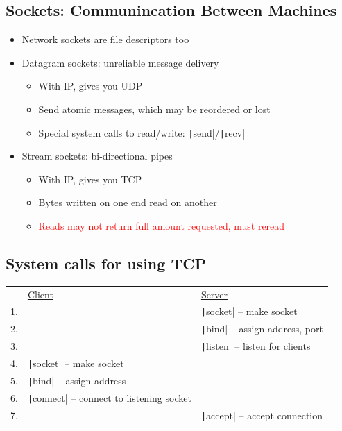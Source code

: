 \subsection{Sockets: Communincation Between Machines}
\begin{itemize}[nosep]
    \item Network sockets are file descriptors too
    \item Datagram sockets: unreliable message delivery
          \begin{itemize}[nosep]
              \item With IP, gives you UDP
              \item Send atomic messages, which may be reordered or lost
              \item Special system calls to read/write: \texttt|send|/\texttt|recv|
          \end{itemize}
    \item Stream sockets: bi-directional pipes
          \begin{itemize}[nosep]
              \item With IP, gives you TCP
              \item Bytes written on one end read on another
              \item \textcolor{red}{Reads may not return full amount requested, must reread}
          \end{itemize}
\end{itemize}
\subsection{System calls for using TCP}
\begin{table}[H]
    \begin{tabular}{l l l}
           & \underline{Client}                                     & \underline{Server}                           \\
        1. &                                                        & \texttt|socket| -- make socket        \\
        2. &                                                        & \texttt|bind| -- assign address, port \\
        3. &                                                        & \texttt|listen| -- listen for clients \\
        4. & \texttt|socket| -- make socket                  &                                              \\
        5. & \texttt|bind| -- assign address\footnotemark    &                                              \\
        6. & \texttt|connect| -- connect to listening socket &                                              \\
        7. &                                                        & \texttt|accept| -- accept connection
    \end{tabular}
\end{table}
